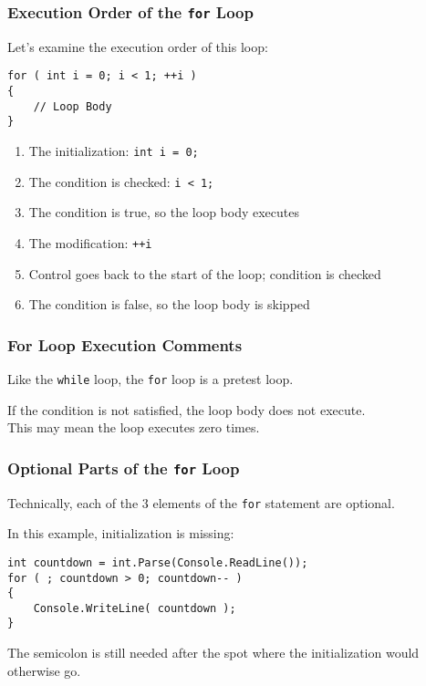 \begin{frame}[fragile]
\frametitle{Execution Order of the \texttt{for} Loop}

Let's examine the execution order of this loop:

\begin{verbatim}
for ( int i = 0; i < 1; ++i )
{
    // Loop Body
}
\end{verbatim}

\begin{enumerate}
	\item The initialization: \texttt{int i = 0;}
	\item The condition is checked: \texttt{i < 1;}
	\item The condition is true, so the loop body executes
	\item The modification: \texttt{++i}
	\item Control goes back to the start of the loop; condition is checked
	\item The condition is false, so the loop body is skipped
\end{enumerate}


\end{frame}

\begin{frame}
\frametitle{For Loop Execution Comments}

Like the \texttt{while} loop, the \texttt{for} loop is a pretest loop.

If the condition is not satisfied, the loop body does not execute.\\
\quad This may mean the loop executes zero times.

\end{frame}

\begin{frame}[fragile]
\frametitle{Optional Parts of the \texttt{for} Loop}

Technically, each of the 3 elements of the \texttt{for} statement are optional.

In this example, initialization is missing:

\begin{verbatim}
int countdown = int.Parse(Console.ReadLine());
for ( ; countdown > 0; countdown-- )
{
    Console.WriteLine( countdown );
}
\end{verbatim}

The semicolon is still needed after the spot where the initialization would otherwise go.

\end{frame}

